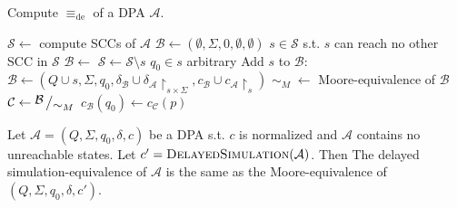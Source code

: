 \begin{algorithm}
  \caption{Compute $\equiv_\text{de}$ of a DPA $\mathcal{A}$.}
  \label{alg:fwe:equiv_de_alt}
  \begin{algorithmic}[1]
      \State $\mathcal{S} \gets$ compute SCCs of $\mathcal{A}$
      \State $\mathcal{B} \gets (\emptyset, \Sigma, 0, \emptyset, \emptyset)$
        \State $s \in \mathcal{S}$ s.t. $s$ can reach no other SCC in $\mathcal{S}$
        \State $\mathcal{B} \gets$ 
        \State $\mathcal{S} \gets \mathcal{S} \setminus s$
      \EndWhile
      \State {}
    \EndFunction
    \Statex
      \State $q_0 \in s$ arbitrary
      \State Add $s$ to $\mathcal{B}$: $\mathcal{B} \gets (Q \cup s, \Sigma, q_0, \delta_\mathcal{B} \cup \delta_\mathcal{A}\upharpoonright_{s \times \Sigma}, c_\mathcal{B} \cup c_\mathcal{A}\upharpoonright_s)$
      \State $\sim_M \; \gets$ Moore-equivalence of $\mathcal{B}$
      \State $\mathcal{C} \gets \bigslant{\mathcal{B}}{\sim_M}$
          \State $c_\mathcal{B}(q_0) \gets c_\mathcal{C}(p)$
        \EndIf
      \EndIf
      \State {}
    \EndFunction
  \end{algorithmic}
\end{algorithm}


\begin{theorem}
	Let $\mathcal{A} = (Q, \Sigma, q_0, \delta, c)$ be a DPA s.t. $c$ is normalized and $\mathcal{A}$ contains no unreachable states. Let $c' = \textsc{DelayedSimulation}(\mathcal{A})$. Then The delayed simulation-equivalence of $\mathcal{A}$ is the same as the Moore-equivalence of $(Q, \Sigma, q_0, \delta, c')$.
\end{theorem}

